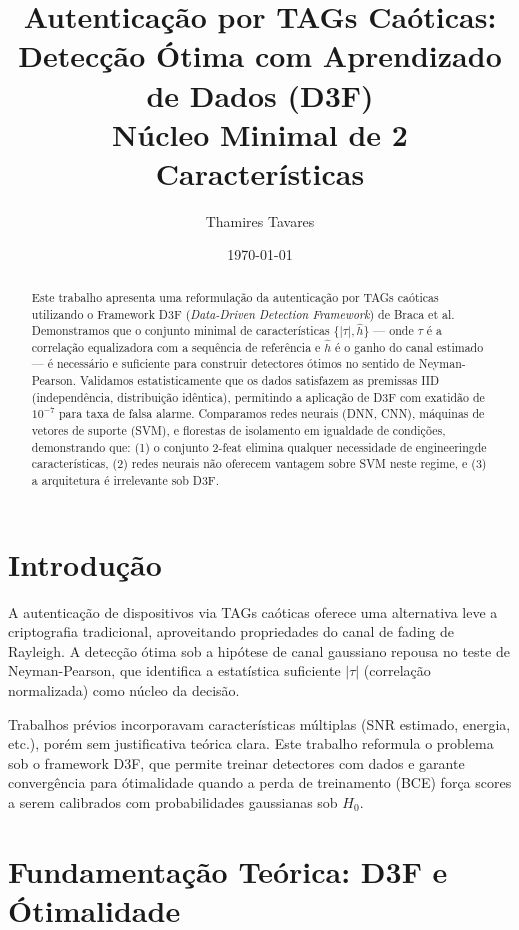 \documentclass[10pt, a4paper]{article}
\title{Autenticação por TAGs Caóticas: Detecção Ótima com Aprendizado de Dados (D3F) \\ Núcleo Minimal de 2 Características}
\author{Thamires Tavares}
\date{\today}
\begin{document}
\maketitle

\begin{abstract}
Este trabalho apresenta uma reformulação da autenticação por TAGs caóticas utilizando o Framework D3F (\textit{Data-Driven Detection Framework}) de Braca et al. Demonstramos que o conjunto minimal de características $\{|\tau|, \hat{h}\}$ --- onde $\tau$ é a correlação equalizadora com a sequência de referência e $\hat{h}$ é o ganho do canal estimado --- é necessário e suficiente para construir detectores ótimos no sentido de Neyman-Pearson. Validamos estatisticamente que os dados satisfazem as premissas IID (independência, distribuição idêntica), permitindo a aplicação de D3F com exatidão de $10^{-7}$ para taxa de falsa alarme. Comparamos redes neurais (DNN, CNN), máquinas de vetores de suporte (SVM), e florestas de isolamento em igualdade de condições, demonstrando que: (1) o conjunto 2-feat elimina qualquer necessidade de engineeringde características, (2) redes neurais não oferecem vantagem sobre SVM neste regime, e (3) a arquitetura é irrelevante sob D3F.
\end{abstract}

\section{Introdução}

A autenticação de dispositivos via TAGs caóticas \cite{braca2020pla} oferece uma alternativa leve a criptografia tradicional, aproveitando propriedades do canal de fading de Rayleigh. A detecção ótima sob a hipótese de canal gaussiano repousa no teste de Neyman-Pearson, que identifica a estatística suficiente $|\tau|$ (correlação normalizada) como núcleo da decisão.

Trabalhos prévios incorporavam características múltiplas (SNR estimado, energia, etc.), porém sem justificativa teórica clara. Este trabalho reformula o problema sob o framework D3F, que permite treinar detectores com dados e garante convergência para ótimalidade quando a perda de treinamento (BCE) força scores a serem calibrados com probabilidades gaussianas sob $H_0$.

\section{Fundamentação Teórica: D3F e Ótimalidade}
\end{document}
